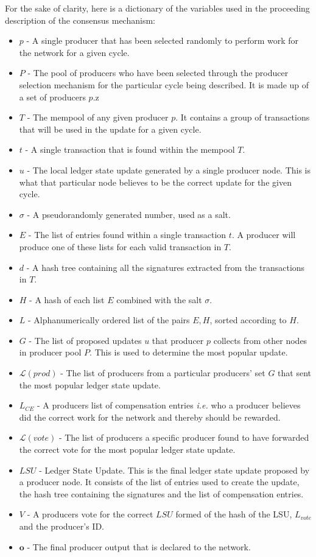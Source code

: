 For the sake of clarity, here is a dictionary of the variables used in the proceeding description of the consensus mechanism:

\begin{itemize}

\item $p$ - A single producer that has been selected randomly to perform work for the network for a given cycle.
\item $P$ - The pool of producers who have been selected through the producer selection mechanism for the particular cycle being described. It is made up of a set of producers $p$.z
\item $T$ - The mempool of any given producer $p$. It contains a group of transactions that will be used in the update for a given cycle.
\item $t$ - A single transaction that is found within the mempool $T$.
\item $u$ - The local ledger state update generated by a single producer node. This is what that particular node believes to be the correct update for the given cycle.
\item $\sigma$ - A pseudorandomly generated number, used as a salt.
\item $E$ - The list of entries found within a single transaction $t$. A producer will produce one of these lists for each valid transaction in $T$.
\item $d$ - A hash tree containing all the signatures extracted from the transactions in $T$.
\item $H$ - A hash of each list $E$ combined with the salt $\sigma$.
\item $L$ - Alphanumerically ordered list of the pairs $E,H$, sorted according to $H$.
\item $G$ - The list of proposed updates $u$ that producer $p$ collects from other nodes in producer pool $P$. This is used to determine the most popular update.
\item $\mathcal{L}(prod)$ - The list of producers from a particular producers' set $G$ that sent the most popular ledger state update.
\item $L_{CE}$ - A producers list of compensation entries \textit{i.e.} who a producer believes did the correct work for the network and thereby should be rewarded.
\item $\mathcal{L}(vote)$ - The list of producers a specific producer found to have forwarded the correct vote for the most popular ledger state update.
\item $LSU$ - Ledger State Update. This is the final ledger state update proposed by a producer node. It consists of the list of entries used to create the update, the hash tree containing the signatures and the list of compensation entries.
\item $V$ - A producers vote for the correct $LSU$ formed of the hash of the LSU, $L_{vote}$ and the producer's ID.
\item $\mathbf{o}$ - The final producer output that is declared to the network.
\end{itemize}
